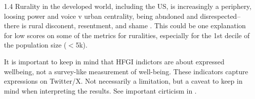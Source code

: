 \documentclass[10pt, letterpaper]{article}
\begin{document}
\begin{spacing}{1.4}
Rurality in
 the developed world, including the US, is increasingly a periphery, loosing power and voice v
 urban centrality, being abndoned and disrespected--there is rural disconent,
 resentment, and shame
 \citep{hansonCityJournalautumn15,fullerNYT17monD,pospvech2024loss,diamond23}. This could
 be one explanation for low scores on some of the metrics for ruralities,
 especially for the 1st decile of the population size ($<$5k).

It is important to  keep in mind that HFGI indictors are about expressed wellbeing,
not a survey-like measurement of well-being. These indicators capture
expressions on Twitter/X. Not necessarily a limitation, but a caveat to keep in
mind when interpreting the results. See important cirticism in
\citet{jensen2017putting}. 







    

\end{spacing}
\end{document}
